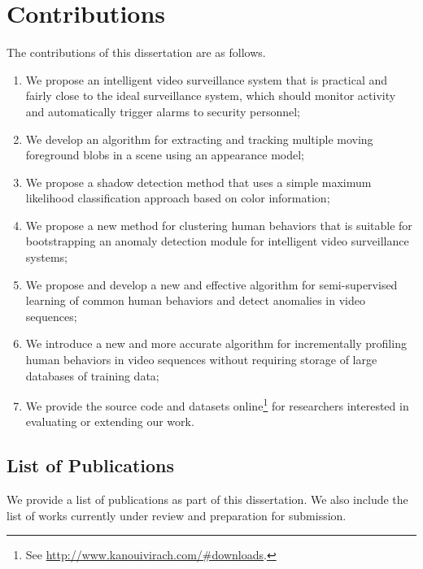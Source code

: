 \section{Contributions}

The contributions of this dissertation are as follows.

\begin{enumerate}
  \item We propose an intelligent video surveillance system that is
    practical and fairly close to the ideal surveillance system, which
    should monitor activity and automatically trigger alarms to security
    personnel;

  \item We develop an algorithm for extracting and tracking multiple 
    moving foreground blobs in a scene using an appearance model;

  \item We propose a shadow detection method that uses a simple
    maximum likelihood classification approach based on color
    information;

  \item We propose a new method for clustering human behaviors that 
    is suitable for bootstrapping an anomaly detection module for 
    intelligent video surveillance systems;

  \item We propose and develop a new and effective algorithm for
    semi-supervised learning of common human behaviors and detect 
    anomalies in video sequences;

  \item We introduce a new and more accurate algorithm for
    incrementally profiling human behaviors in video sequences without
    requiring storage of large databases of training data;

  \item We provide the source code and datasets
    online\footnote{See \url{http://www.kanouivirach.com/#downloads}.}
    for researchers interested in evaluating or extending our work.
\end{enumerate}

\subsection{List of Publications}

We provide a list of publications as part of this dissertation. We
also include the list of works currently under review and preparation
for submission.

